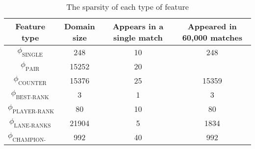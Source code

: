 \begin{center}
\begin{table}[h]
\begin{tabular}{|c|c|c|c|}
\hline
Feature type                & Domain size & Appears in a single match & Appeared in 60,000 matches \\ \hline
$\phi_{\text{SINGLE}}$      & 248         & 10 & 248               \\ \hline
$\phi_{\text{PAIR}}$        & 15252       & 20 &                   \\ \hline
$\phi_{\text{COUNTER}}$     & 15376       & 25 & 15359             \\ \hline
$\phi_{\text{BEST-RANK}}$   & 3           & 1  & 3                 \\ \hline
$\phi_{\text{PLAYER-RANK}}$ & 80          & 10 & 80                \\ \hline
$\phi_{\text{LANE-RANKS}}$  & 21904       & 5  & 1834              \\ \hline
$\phi_{\text{CHAMPION-LANE}}$ & 992       & 40 & 992               \\ \hline
\end{tabular}
\caption{The sparsity of each type of feature}\label{tab:featuresparsity}
\end{table}
\end{center}

